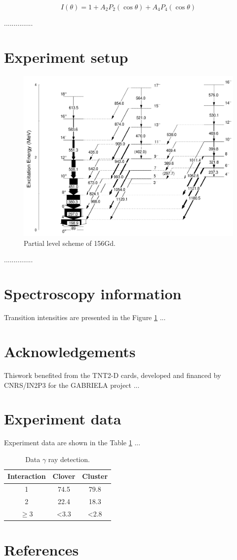 \documentclass[5p,12pt]{elsarticle}
\begin{document}
\begin{equation}
\label{equa:distr}
I(\theta) = 1 + A_{2}P_{2}(\cos{\theta}) + A_{4}P_{4}(\cos{\theta})
\end{equation}

...............

\section{Experiment setup}

\begin{figure}[!htb]
\centering
	\includegraphics[width=0.5\linewidth]{156Gd.png}
	\caption{Partial level scheme of 156Gd.}
	\label{fig:156Gd}
\end{figure}

...............

\section{Spectroscopy information}
Transition intensities are presented in the Figure \ref{fig:156Gd} ... 

\section{Acknowledgements}

Thiswork benefited from the TNT2-D cards, developed and financed by CNRS/IN2P3 for the GABRIELA project ...


\appendix
\section{Experiment data}
\label{app:expdata}

Experiment data are shown in the Table \ref{tab:data} ... 

\begin{table}[!htb]
\centering
	\caption{Data $\gamma$ ray detection.}
	\label{tab:data} 
	\begin{tabular}{ccc}
		\hline
		Interaction	& Clover 	& Cluster\\
		\hline
		1	& 74.5 & 79.8\\
		2	& 22.4 & 18.3\\
		$\ge$3	& <3.3 & <2.8\\
		\hline
	\end{tabular}
\end{table}


\section*{References}
 

\end{document}
